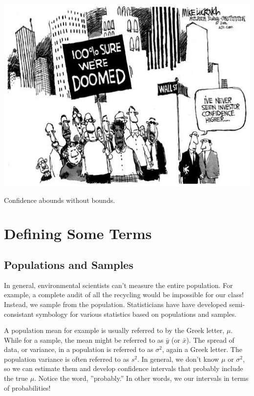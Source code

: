 \documentclass{tufte-handout}\usepackage[]{graphicx}\usepackage[]{color}
\begin{document}
\begin{marginfigure}
	\centering
		\includegraphics[width=1.00\textwidth]{Investor_confidence500.jpg}
	\caption{Confidence abounds without bounds.}
	\label{fig:Investor_confidence500}
\end{marginfigure}

\section{Defining Some Terms}

\subsection{Populations and Samples}

In general, environmental scientists can't measure the entire population. For example, a complete audit of all the recycling would be impossible for our class!  Instead, we sample from the population. Statisticians have have developed semi-consistant symbology for various statistics based on populations and samples. 

A population mean for example is usually referred to by the Greek letter, $\mu$. While for a sample, the mean might be referred to as $\bar{y}$ (or $\bar{x}$). The spread of data, or variance, in a population is referred to as $\sigma^2$, again a Greek letter. The population variance is often referred to as $s^2$. In general, we don't know $\mu$ or $\sigma^2$, so we can estimate them and develop confidence intervals that probably include the true $\mu$. Notice the word, ''probably.''  In other words, we our intervals in terms of probabilities!
\end{document}
